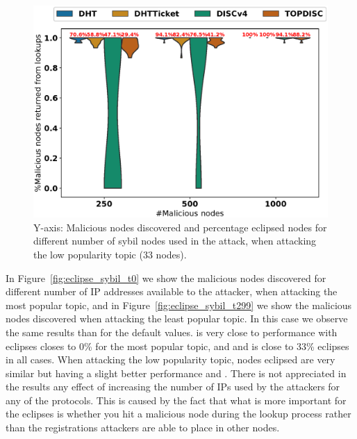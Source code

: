 \begin{figure}[!h]
\includegraphics[width=\linewidth]{results/security/violin_percentEvil_percentageMaliciousDiscovered_t299.eps}
\caption{Y-axis: Malicious nodes discovered and percentage eclipsed nodes for different number of sybil nodes used in the attack,  when attacking the low popularity topic (33 nodes).}
\label{fig:eclipse_evil_t299}
\end{figure}


In Figure~\ref{fig:eclipse_sybil_t0} we show the malicious nodes discovered for different number of IP addresses available to the attacker,  when attacking the most popular topic,  and in Figure~\ref{fig:eclipse_sybil_t299} we show the malicious nodes discovered when attacking the least popular topic.
In this case we observe the same results than for the default values. 
\sysname is very close to \discv performance with eclipses closes to 0\% for the most popular topic, and \altname and \altnameticket is close to 33\% eclipses in all cases.
When attacking the low popularity topic,  nodes eclipsed are very similar but having a slight better performance \discv and \sysname.
There is not appreciated in the results any effect of increasing the number of IPs used by the attackers for any of the protocols.
This is caused by the fact that what is more important for the eclipses is whether you hit a malicious node during the lookup process rather than the registrations attackers are able to place in other nodes.

